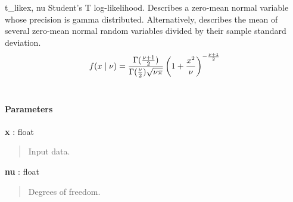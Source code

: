 \hypertarget{pymc.distributions.t_like}{}
\begin{funcdesc}{t\_like}{x, nu}
Student's T log-likelihood. Describes a zero-mean normal variable whose precision is gamma distributed. Alternatively, describes the mean of several zero-mean normal random variables divided by their sample standard deviation.
\begin{gather}
\begin{split}f(x \mid \nu) = \frac{\Gamma(\frac{\nu+1}{2})}{\Gamma(\frac{\nu}{2}) \sqrt{\nu\pi}} \left( 1 + \frac{x^2}{\nu} \right)^{-\frac{\nu+1}{2}}\end{split}\notag\\\begin{split}\end{split}\notag
\end{gather}\paragraph{Parameters}\begin{paramlist}

\item[] \textbf{x} : float
\begin{quote}

Input data.
\end{quote}

\item[] \textbf{nu} : float
\begin{quote}

Degrees of freedom.
\end{quote}
\end{paramlist}
\end{funcdesc}


